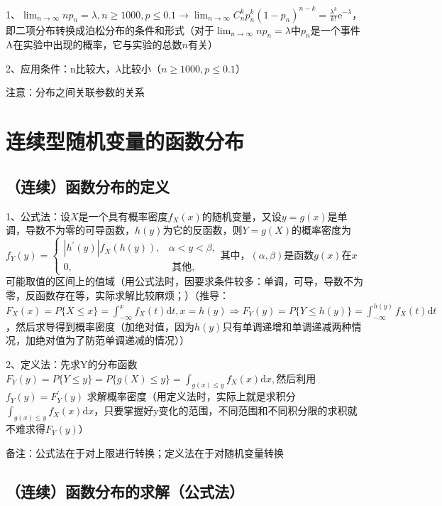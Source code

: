 1、$\lim_{n \rightarrow \infty}np_n=\lambda, n\ge1000,p\le0.1 \rightarrow \lim _{n \rightarrow \infty} C_{n}^{k} p_{n}^{k}\left(1-p_{n}\right)^{n-k}=\frac{\lambda^{k}}{k !} \mathrm{e}^{-\lambda}$，即二项分布转换成泊松分布的条件和形式（对于$\lim_{n \rightarrow \infty}np_n=\lambda$中$p_n$是一个事件A在实验中出现的概率，它与实验的总数$n$有关）

2、应用条件：n比较大，$\lambda$比较小（$n\ge1000,p\le0.1$）

注意：分布之间关联参数的关系



\section{连续型随机变量的函数分布}



\subsection{（连续）函数分布的定义}

1、公式法：设$X$是一个具有概率密度$f_X(x)$的随机变量，又设$y=g(x)$是单调，导数不为零的可导函数，$h(y)$为它的反函数，则$Y=g(X)$的概率密度为$f_{Y}(y)=\left\{\begin{array}{cc}\left|h^{\prime}(y)\right| f_{X}(h(y)), & \alpha<y<\beta, \\0, & \text { 其他, }\end{array}\right.$其中，$(\alpha,\beta)$是函数$g(x)$在$x$可能取值的区间上的值域（用公式法时，因要求条件较多：单调，可导，导数不为零，反函数存在等，实际求解比较麻烦；）（推导：$F_{X}(x)=P\{X \leqslant x\}=\int_{-\infty}^{x} f_{X}(t) \mathrm{d} t, x=h(y) \Rightarrow F_{Y}(y)=P\{Y \leqslant h(y)\}=\int_{-\infty}^{h(y)} f_{X}(t) \mathrm{d} t$，然后求导得到概率密度（加绝对值，因为$h(y)$只有单调递增和单调递减两种情况，加绝对值为了防范单调递减的情况））

2、定义法：先求Y的分布函数$F_{Y}(y)=P\{Y \leqslant y\}=P\{g(X) \leqslant y\}=\int_{g(x) \leqslant y} f_{X}(x) \mathrm{d} x, $然后利用$f_{Y}(y)=F_{Y}^{\prime}(y)$ 求解概率密度（用定义法时，实际上就是求积分$\int_{g(x) \leqslant y} f_{X}(x) \mathrm{d} x$，只要掌握好y变化的范围，不同范围和不同积分限的求积就不难求得$F_Y(y)$）

备注：公式法在于对上限进行转换；定义法在于对随机变量转换



\subsection{（连续）函数分布的求解（公式法）}

